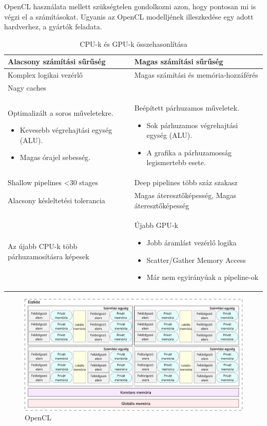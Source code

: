 OpenCL használata mellett szükségtelen gondolkozni azon, hogy pontosan mi is végzi el a számításokat. Ugyanis az OpenCL modelljének illeszkedése egy adott hardverhez, a gyártók feladata.

\begin{table}[h!]
\centering
\caption{CPU-k és GPU-k összehasonlítása}
\medskip
\label{tab:cpuvsgpu}
\begin{tabular}{|p{7cm}|p{7cm}|}
\hline
Alacsony számítási sűrűség & Magas számítási sűrűség \\
\hline
Komplex logikai vezérlő & Magas számítási és memória-hozzáférés \\
\hline
Nagy caches &   \\
\hline
Optimalizált a soros műveletekre.
\begin{itemize}
	\item Kevesebb végrehajtási egység (ALU).
	\item Magas órajel sebesség.
\end{itemize} & Beépített párhuzamos műveletek.
\begin{itemize}
	\item Sok párhuzamos végrehajtási egység (ALU).
	\item A grafika a párhuzamosság legismertebb esete.
\end{itemize} \\
\hline
Shallow pipelines <30 stages & Deep pipelines több száz szakasz \\
\hline
Alacsony késleltetési tolerancia & Magas áteresztőképesség, Magas áteresztőképesség \\
\hline
Az újabb CPU-k több párhuzamosításra képesek & Újabb GPU-k
\begin{itemize}
	\item Jobb áramlást vezérlő logika
	\item Scatter/Gather Memory Access
	\item Már nem egyirányúak a pipeline-ok
\end{itemize} \\
\hline
\end{tabular}
\end{table}


\begin{figure}[h!]
\centering
\includegraphics[width=\textwidth]{images/device.png}
\caption{OpenCL}
\label{fig:opencl}
\end{figure}

